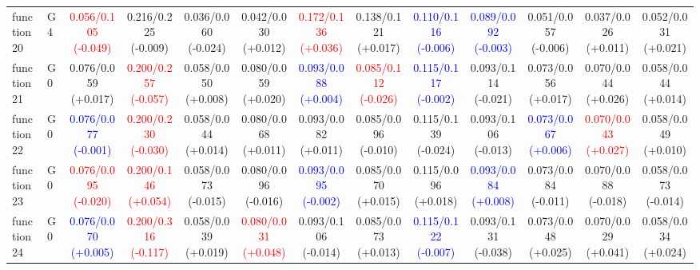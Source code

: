 \begin{table}[htbp]
\begin{adjustbox}{max width=\textwidth}
\begin{tabular}{llccccccccccc}
function20 & G4 & \textcolor{red}{0.056/0.105 (-0.049)} & 0.216/0.225 (-0.009) & 0.036/0.060 (-0.024) & 0.042/0.030 (+0.012) & \textcolor{red}{0.172/0.136 (+0.036)} & 0.138/0.121 (+0.017) & \textcolor{blue}{0.110/0.116 (-0.006)} & \textcolor{blue}{0.089/0.092 (-0.003)} & 0.051/0.057 (-0.006) & 0.037/0.026 (+0.011) & 0.052/0.031 (+0.021) \\
function21 & G0 & 0.076/0.059 (+0.017) & \textcolor{red}{0.200/0.257 (-0.057)} & 0.058/0.050 (+0.008) & 0.080/0.059 (+0.020) & \textcolor{blue}{0.093/0.088 (+0.004)} & \textcolor{red}{0.085/0.112 (-0.026)} & \textcolor{blue}{0.115/0.117 (-0.002)} & 0.093/0.114 (-0.021) & 0.073/0.056 (+0.017) & 0.070/0.044 (+0.026) & 0.058/0.044 (+0.014) \\
function22 & G0 & \textcolor{blue}{0.076/0.077 (-0.001)} & \textcolor{red}{0.200/0.230 (-0.030)} & 0.058/0.044 (+0.014) & 0.080/0.068 (+0.011) & 0.093/0.082 (+0.011) & 0.085/0.096 (-0.010) & 0.115/0.139 (-0.024) & 0.093/0.106 (-0.013) & \textcolor{blue}{0.073/0.067 (+0.006)} & \textcolor{red}{0.070/0.043 (+0.027)} & 0.058/0.049 (+0.010) \\
function23 & G0 & \textcolor{red}{0.076/0.095 (-0.020)} & \textcolor{red}{0.200/0.146 (+0.054)} & 0.058/0.073 (-0.015) & 0.080/0.096 (-0.016) & \textcolor{blue}{0.093/0.095 (-0.002)} & 0.085/0.070 (+0.015) & 0.115/0.096 (+0.018) & \textcolor{blue}{0.093/0.084 (+0.008)} & 0.073/0.084 (-0.011) & 0.070/0.088 (-0.018) & 0.058/0.073 (-0.014) \\
function24 & G0 & \textcolor{blue}{0.076/0.070 (+0.005)} & \textcolor{red}{0.200/0.316 (-0.117)} & 0.058/0.039 (+0.019) & \textcolor{red}{0.080/0.031 (+0.048)} & 0.093/0.106 (-0.014) & 0.085/0.073 (+0.013) & \textcolor{blue}{0.115/0.122 (-0.007)} & 0.093/0.131 (-0.038) & 0.073/0.048 (+0.025) & 0.070/0.029 (+0.041) & 0.058/0.034 (+0.024) \\
\bottomrule
\end{tabular}
\end{adjustbox}
\end{table}
